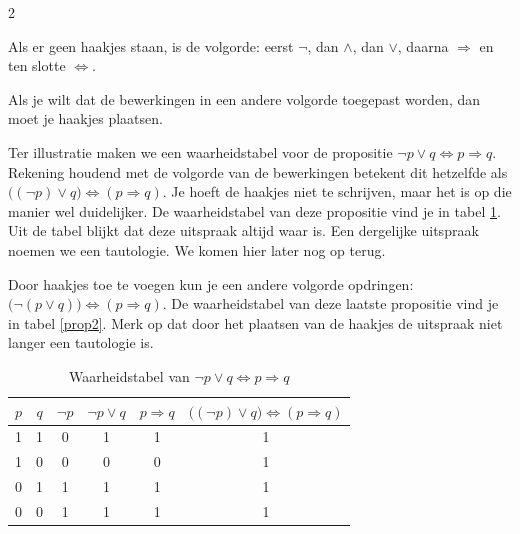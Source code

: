 \begin{multicols}{2}
\begin{opsomming}
\item Als er geen haakjes staan, is de volgorde: eerst $\lnot$, dan $\land$, dan $\lor$, daarna $\Rightarrow$ en ten slotte $\Leftrightarrow$.

\item Als je wilt dat de bewerkingen in een andere volgorde toegepast worden, dan moet je haakjes plaatsen.
\end{opsomming}


Ter illustratie maken we een waarheidstabel voor de propositie $\lnot p \lor q \Leftrightarrow p \Rightarrow q$. Rekening houdend met de volgorde van de bewerkingen betekent dit hetzelfde als $\big( (\lnot p) \lor q \big) \Leftrightarrow (p\Rightarrow q)$. Je hoeft de haakjes niet te schrijven, maar het is op die manier wel duidelijker. De waarheidstabel van deze propositie vind je in tabel \ref{prop1}. Uit de tabel blijkt dat deze uitspraak altijd waar is. Een dergelijke uitspraak noemen we een tautologie. We komen hier later nog op terug.

Door haakjes toe te voegen kun je een andere volgorde opdringen: $\big( \lnot (p \lor q) \big) \Leftrightarrow (p \Rightarrow q)$. De waarheidstabel van deze laatste propositie vind je in tabel \ref{prop2}. Merk op dat door het plaatsen van de haakjes de uitspraak niet langer een tautologie is.

\end{multicols}
\begin{table}[h]
\begin{center}
\begin{tabular}{c|c|c|c|c|c}  
$p$ & $q$ & $\lnot p$ & $\lnot p \lor q$ & $p\Rightarrow q$ & $\big( (\lnot p) \lor q \big) \Leftrightarrow (p\Rightarrow q)$\\
\hline
1 & 1 & 0 & 1 & 1 & 1\\
1 & 0 & 0 & 0 & 0 & 1\\
0 & 1 & 1 & 1 & 1 & 1\\
0 & 0 & 1 & 1 & 1 & 1
\end{tabular}
\caption{Waarheidstabel van $\lnot p \lor q \Leftrightarrow p \Rightarrow q$} \label{prop1}
\end{center}
\end{table}


